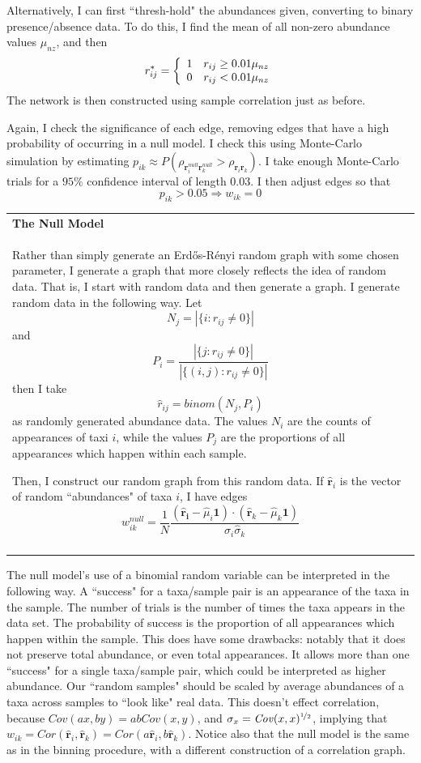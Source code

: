\documentclass[10pt]{article}
\theoremstyle{definition}
\numberwithin{theorem}{section}
\numberwithin{definition}{section}
\numberwithin{lemma}{section}
\numberwithin{corollary}{section}
\numberwithin{clm}{section}
\numberwithin{rmk}{section}
\newenvironment{inbox}[1]
{\begin{center}
		\begin{tabular}{|p{0.9\textwidth}|}
			\hline
			{\bf #1}\\
		}
		{ 
			\\\\\hline
		\end{tabular} 
	\end{center}
}
\newcommand{\nhalf}{\nicefrac{1}{2}}
\renewcommand{\b}{\bm}
\begin{document}
Alternatively, I can first ``thresh-hold" the abundances given, converting to binary presence/absence data. To do this, I find the mean of all non-zero abundance values $\mu_{nz}$, and then
\[
r^*_{ij} = \left\{\begin{array}{c c}
1 & r_{ij} \geq 0.01\mu_{nz}\\
0 & r_{ij} < 0.01 \mu_{nz}
\end{array}\right.
\]
The network is then constructed using sample correlation just as before.

Again, I check the significance of each edge, removing edges that have a high probability of occurring in a null model. I check this using Monte-Carlo simulation by estimating $p_{ik} \approx P(\rho_{\b{r}_i^{null}\b{r}_k^{null}} > \rho_{\b{r}_i\b{r}_k})$. I take enough Monte-Carlo trials for a $95\%$ confidence interval of length $0.03$. I then adjust edges so that
\[
p_{ik} > 0.05 \Rightarrow w_{ik} = 0
\]

\begin{inbox}{The Null Model}
	Rather than simply generate an Erd\H{o}s-R\'{e}nyi random graph with some chosen parameter, I generate a graph that more closely reflects the idea of random data. That is, I start with random data and then generate a graph. I generate random data in the following way. Let 
	\[
	N_j = |\{i: r_{ij} \neq 0\}|
	\]
	and 
	\[
	P_i = \frac{|\{j: r_{ij}\neq 0 \}|}{|\{(i,j): r_{ij}\neq 0 \}|}
	\]
	then I take 
	\[
	\hat{r}_{ij} = \mathit{binom}(N_j,P_i)
	\]
	as randomly generated abundance data. The values $N_i$ are the counts of appearances of taxi $i$, while the values $P_j$ are the proportions of all appearances which happen within each sample. 
	
	Then, I construct our random graph from this random data. If $\hat{\b{r}}_i$ is the vector of random ``abundances" of taxa $i$, I have edges
	\[
	w_{ik}^{null} = \frac{1}{N}\frac{(\b{\hat{\b{r}}_i}- \hat{\mu}_i\b{1}) \cdot (\hat{\b{r}}_k - \hat{\mu}_k\b{1})}{\hat{\sigma}_i \hat{\sigma}_k}
	\]
\end{inbox}

The null model's use of a binomial random variable can be interpreted in the following way. A ``success" for a taxa/sample pair is an appearance of the taxa in the sample. The number of trials is the number of times the taxa appears in the data set. The probability of success is the proportion of all appearances which happen within the sample. This does have some drawbacks: notably that it does not preserve total abundance, or even total appearances. It allows more than one ``success" for a single taxa/sample pair, which could be interpreted as higher abundance. Our ``random samples" should be scaled by average abundances of a taxa across samples to ``look like" real data. This doesn't effect correlation, because $\mathit{Cov}(ax,by) = ab\mathit{Cov}(x,y)$, and $\sigma_x = \mathit{Cov}(x,x)^{\nhalf}$, implying that $w_{ik} = \mathit{Cor}(\hat{\b{r}}_i,\hat{\b{r}}_k) =  \mathit{Cor}(a\hat{\b{r}}_i,b\hat{\b{r}}_k)$. Notice also that the null model is the same as in the binning procedure, with a different construction of a correlation graph.
\end{document}
